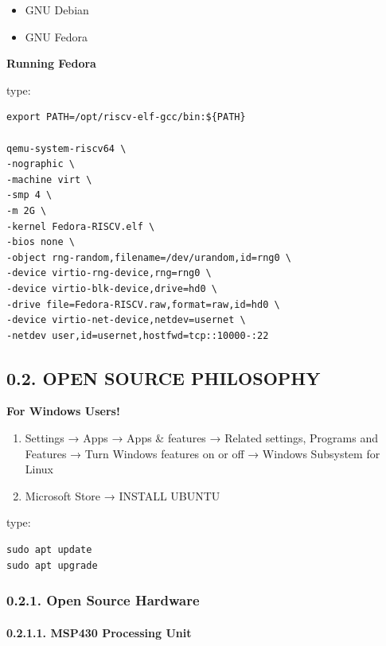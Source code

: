 \documentclass[
]{article}
\begin{document}
\begin{itemize}
\item
  GNU Debian
\item
  GNU Fedora
\end{itemize}

\textbf{Running Fedora}

type:

\begin{verbatim}
export PATH=/opt/riscv-elf-gcc/bin:${PATH}

qemu-system-riscv64 \
-nographic \
-machine virt \
-smp 4 \
-m 2G \
-kernel Fedora-RISCV.elf \
-bios none \
-object rng-random,filename=/dev/urandom,id=rng0 \
-device virtio-rng-device,rng=rng0 \
-device virtio-blk-device,drive=hd0 \
-drive file=Fedora-RISCV.raw,format=raw,id=hd0 \
-device virtio-net-device,netdev=usernet \
-netdev user,id=usernet,hostfwd=tcp::10000-:22
\end{verbatim}

\hypertarget{open-source-philosophy-1}{%
\subsection{0.2. OPEN SOURCE
PHILOSOPHY}\label{open-source-philosophy-1}}

\textbf{For Windows Users!}

\begin{enumerate}
\def\labelenumi{\arabic{enumi}.}
\item
  Settings → Apps → Apps \& features → Related settings, Programs and
  Features → Turn Windows features on or off → Windows Subsystem for
  Linux
\item
  Microsoft Store → INSTALL UBUNTU
\end{enumerate}

type:

\begin{verbatim}
sudo apt update
sudo apt upgrade
\end{verbatim}

\hypertarget{open-source-hardware-1}{%
\subsubsection{0.2.1. Open Source
Hardware}\label{open-source-hardware-1}}

\hypertarget{msp430-processing-unit-1}{%
\paragraph{0.2.1.1. MSP430 Processing
Unit}\label{msp430-processing-unit-1}}
\end{document}
